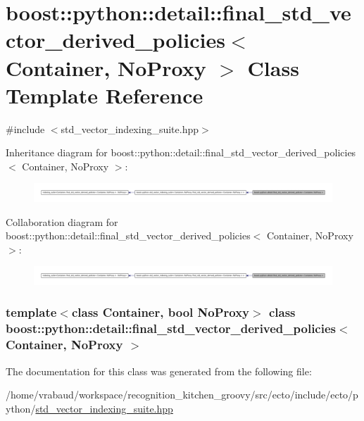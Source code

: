 \hypertarget{classboost_1_1python_1_1detail_1_1final__std__vector__derived__policies}{\section{boost\-:\-:python\-:\-:detail\-:\-:final\-\_\-std\-\_\-vector\-\_\-derived\-\_\-policies$<$ \-Container, \-No\-Proxy $>$ \-Class \-Template \-Reference}
\label{classboost_1_1python_1_1detail_1_1final__std__vector__derived__policies}
}


{\ttfamily \#include $<$std\-\_\-vector\-\_\-indexing\-\_\-suite.\-hpp$>$}



\-Inheritance diagram for boost\-:\-:python\-:\-:detail\-:\-:final\-\_\-std\-\_\-vector\-\_\-derived\-\_\-policies$<$ \-Container, \-No\-Proxy $>$\-:\nopagebreak
\begin{figure}[H]
\begin{center}
\leavevmode
\includegraphics[width=350pt]{classboost_1_1python_1_1detail_1_1final__std__vector__derived__policies__inherit__graph}
\end{center}
\end{figure}


\-Collaboration diagram for boost\-:\-:python\-:\-:detail\-:\-:final\-\_\-std\-\_\-vector\-\_\-derived\-\_\-policies$<$ \-Container, \-No\-Proxy $>$\-:\nopagebreak
\begin{figure}[H]
\begin{center}
\leavevmode
\includegraphics[width=350pt]{classboost_1_1python_1_1detail_1_1final__std__vector__derived__policies__coll__graph}
\end{center}
\end{figure}
\subsubsection*{template$<$class Container, bool \-No\-Proxy$>$ class boost\-::python\-::detail\-::final\-\_\-std\-\_\-vector\-\_\-derived\-\_\-policies$<$ Container, No\-Proxy $>$}



\-The documentation for this class was generated from the following file\-:\begin{DoxyCompactItemize}
\item 
/home/vrabaud/workspace/recognition\-\_\-kitchen\-\_\-groovy/src/ecto/include/ecto/python/\hyperlink{std__vector__indexing__suite_8hpp}{std\-\_\-vector\-\_\-indexing\-\_\-suite.\-hpp}\end{DoxyCompactItemize}
